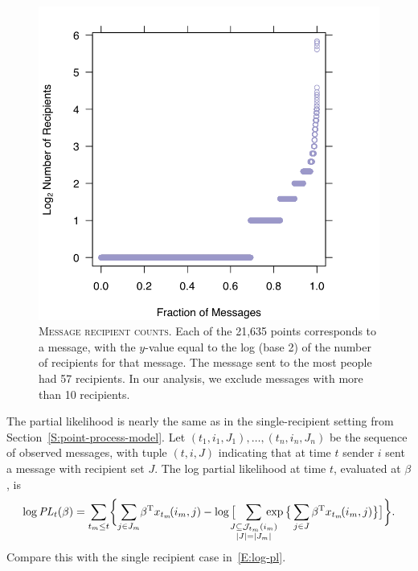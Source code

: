 \documentclass[aoas,preprint]{imsart}
\begin{document}
\begin{figure}
    \includegraphics[scale=0.6]{figures/recipient-counts}
    \caption{
        \textsc{Message recipient counts.}
        Each of the 21,635 points corresponds to a message, with the
        $y$-value equal to the log (base 2) of the number of recipients
        for that message.  The message sent to the most people
        had 57 recipients.  In our analysis, we exclude messages with more
        than 10 recipients.
    }\label{F:recipient-counts}
\end{figure}

The partial likelihood is nearly the same as in the single-recipient
setting from Section~\ref{S:point-process-model}.
Let $(t_1, i_1, J_1), \ldots, (t_n, i_n, J_n)$ be the sequence of
observed messages, with tuple $(t, i, J)$ indicating that at time $t$
sender $i$ sent a message with recipient set $J$.  The log partial likelihood
at time $t$, evaluated at $\beta$, is
\begin{equation}\label{E:log-pl-multiple}
    \log
    \mathit{PL}_t(\beta)
        =
        \sum_{t_m \leq t}\!
        \bigg\{\!
            \sum_{j \in J_m}\!
                \beta^\trans x_{t_m}\!(i_m, j)
            -
            \log\big[
                \!\!\!\!
                \sum_{\substack{J \subseteq \mathcal{J}_{t_m}(i_m) \\
                               |J| = |J_m|}}\!\!\!\!\!\!\!
                    \exp\big\{
                        \sum_{j \in J}
                            \beta^\trans x_{t_m}\!(i_m, j)
                    \big\}
            \big]
        \bigg\}.
\end{equation}
Compare this with the single recipient case in~\eqref{E:log-pl}.
\end{document}

